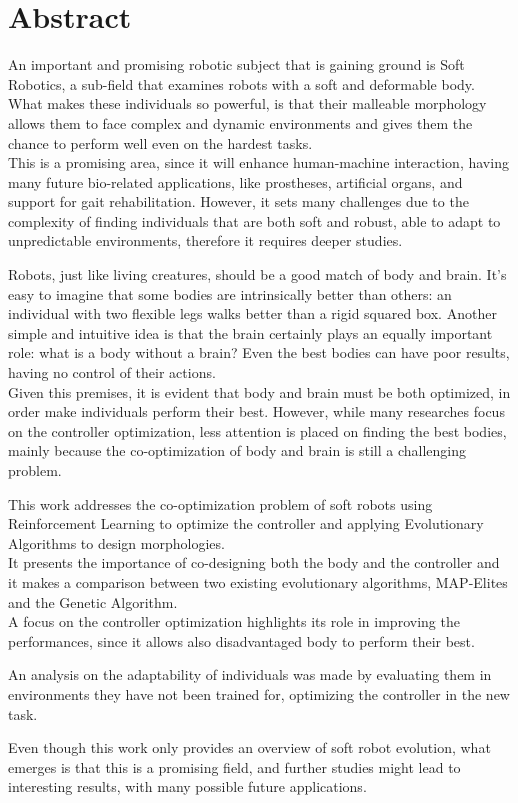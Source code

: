 \chapter*{Abstract} %
\label{abstract}


An important and promising robotic subject that is gaining ground is Soft Robotics, a sub-field that examines robots with a soft and deformable body.\\
What makes these individuals so powerful, is that their malleable morphology allows them to face complex and dynamic environments and gives them the chance to perform well even on the hardest tasks.\\
This is a promising area, since it will enhance human-machine interaction, having many future bio-related applications, like prostheses, artificial organs, and support for gait rehabilitation.
However, it sets many challenges due to the complexity of finding individuals that are both soft and robust, able to adapt to unpredictable environments, therefore it requires deeper studies.

Robots, just like living creatures, should be a good match of body and brain.
It's easy to imagine that some bodies are intrinsically better than others: an individual with two flexible legs walks better than a rigid squared box.
Another simple and intuitive idea is that the brain certainly plays an equally important role: what is a body without a brain?
Even the best bodies can have poor results, having no control of their actions.\\
Given this premises, it is evident that body and brain must be both optimized, in order make individuals perform their best.
However, while many researches focus on the controller optimization, less attention is placed on finding the best bodies, mainly because the co-optimization of body and brain is still a challenging problem.

This work addresses the co-optimization problem of soft robots using Reinforcement Learning to optimize the controller and applying Evolutionary Algorithms to design morphologies.\\
It presents the importance of co-designing both the body and the controller and it makes a comparison between two existing evolutionary algorithms, MAP-Elites and the Genetic Algorithm.\\
A focus on the controller optimization highlights its role in improving the performances, since it allows also disadvantaged body to perform their best.

An analysis on the adaptability of individuals was made by evaluating them in environments they have not been trained for, optimizing the controller in the new task.

Even though this work only provides an overview of soft robot evolution, what emerges is that this is a promising field, and further studies might lead to interesting results, with many possible future applications.




